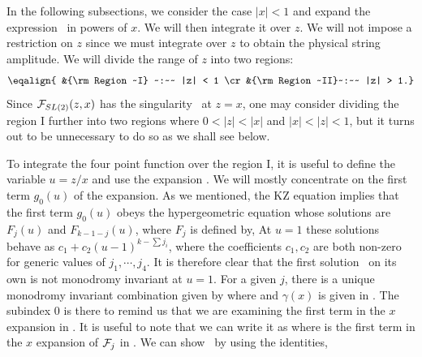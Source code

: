 In the following subsections, we consider the case $|x| < 1$
and expand the expression \expres\ in powers
of $x$. We will then integrate it over $z$.
We will not impose a restriction on $z$ since we
must  integrate over $z$ to obtain the physical string amplitude.
We will divide the range of $z$ into two  regions:
$$ \eqalign{ &{\rm Region ~I} ~:~~  |z| < 1 \cr
             &{\rm Region ~II}~:~~  |z| > 1.}$$
Since ${\cal F}_{SL(2)}(z,x)$ has the singularity \sing\
at $z=x$, one may consider dividing the region I further into
two regions where $0<|z|<|x|$ and $|x|<|z|<1$, but it turns
out to be unnecessary to do so as we shall see below.




To integrate the four point function over the region I,
it is useful to define the variable $u = z/x$
and use the expansion \regionone.
We will mostly concentrate on the first term $g_0(u)$
of the expansion. As we mentioned,
the KZ equation implies that the first term $g_0(u)$
obeys the  hypergeometric
equation whose solutions are $F_j(u)$ and $F_{k-1-j}(u)$,
where $F_j$ is defined by,
\eqn{}
At $u=1$ these solutions
behave as  $ c_1 + c_2 (u-1)^{k-\sum j_i}$,
where the coefficients $c_1,c_2$ are both non-zero
for generic values of $j_1, \cdots, j_4$.
It is therefore clear that the first solution \hypsol\
on its own is not monodromy invariant
at $u=1$. For a given $j$, there is
a unique monodromy invariant combination given by
\eqn{}
where
\eqn{}
and  $\gamma(x)$ is given in  .
The subindex $0$ is there to remind us that we are examining
the first term in the $x$ expansion
in \regionone .
It is useful to note that we can write it as
\eqn{}
where
\eqn{}
is the first term in the $x$ expansion of ${\cal F}_j$
in \regionone .
We can show \anothermonod\ by using the identities,
\eqn{}

